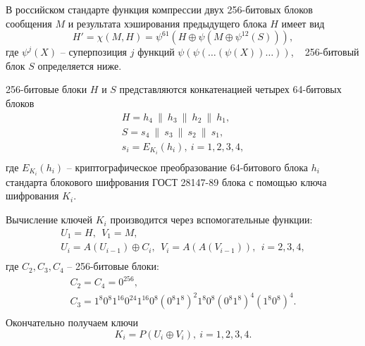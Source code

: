 В российском стандарте функция компрессии двух 256-битовых блоков сообщения $M$ и результата хэширования предыдущего блока $H$ имеет вид
\[
    H' = \chi(M, H) = \psi^{61}(H \oplus \psi(M \oplus \psi^{12}(S))),
\]
где $\psi^j(X)$ -- суперпозиция $j$ функций $\psi( \psi( \dots ( \psi( X)) \dots ))$, ~ 256-битовый блок $S$ определяется ниже.

256-битовые блоки $H$ и $S$ представляются конкатенацией четырех 64-битовых блоков
\[ \begin{array}{l}
    H = h_4 ~\|~ h_3 ~\|~ h_2 ~\|~ h_1, \\
    S = s_4 ~\|~ s_3 ~\|~ s_2 ~\|~ s_1, \\
    s_i = E_{K_i}( h_i), ~ i = 1, 2, 3, 4, \\
\end{array} \]
где $E_{K_i}( h_i)$ -- криптографическое преобразование 64-битового блока $h_i$ стандарта блокового шифрования ГОСТ 28147-89 блока с помощью ключа шифрования $K_i$.

Вычисление ключей $K_i$ производится через вспомогательные функции:
\[ \begin{array}{c}
    U_1 = H, ~~ V_1 = M, \\
    U_i = A(U_{i-1}) \oplus C_i, ~~ V_i = A(A(V_{i-1})), ~~ i = 2, 3, 4, \\
\end{array} \]
где $C_2, C_3, C_4$ -- 256-битовые блоки:
\[ \begin{array}{c}
    C_2 = C_4 = 0^{256}, \\
    C_3 = 1^8 0^8 1^{16} 0^{24} 1^{16} 0^8 (0^8 1^8)^2 1^8 0^8 (0^8 1^8)^4 (1^8 0^8)^4. \\
\end{array} \]
Окончательно получаем ключи
\[
    K_i = P(U_i \oplus V_i), ~ i = 1,2,3,4.
\]

